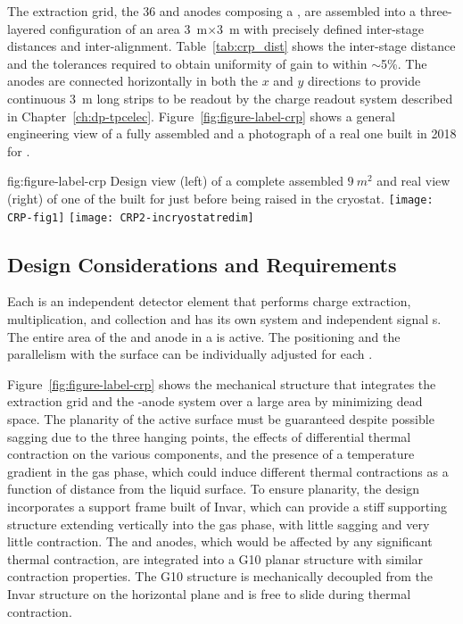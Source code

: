 The extraction grid, the \num{36}  and anodes composing a , are assembled into a three-layered configuration of an area \SI{3}{\m}$\times$\SI{3}{\m} with precisely defined inter-stage distances and inter-alignment. Table~\ref{tab:crp_dist} shows the inter-stage distance and the tolerances required to obtain uniformity of gain to within $\sim$5\%.
The anodes are connected horizontally in both the $x$ and $y$ directions to provide continuous \SI{3}{\m} long strips to be readout by the charge readout system described in Chapter~\ref{ch:dp-tpcelec}. Figure~\ref{fig:figure-label-crp} shows a general engineering view of a  fully assembled  and a photograph of a real one built in \num{2018} for .

\begin{dunefigure}
{fig:figure-label-crp}
{Design view (left) of a complete assembled  $\SI{9}{m^{2}}$  and real view (right) of one of the  built for  just before being raised in the cryostat.}
\texttt{[image: CRP-fig1]}
\texttt{[image: CRP2-incryostatredim]}
\end{dunefigure}

 

\subsection{Design Considerations and Requirements}
\label{ch:dp-crp-consider-requirements}

Each  is an independent detector element that performs charge extraction, multiplication, and collection and has its own  system and independent signal \fdth{}s. The entire area of the  and anode in a  is active. The positioning and the parallelism with the  surface can be individually adjusted for each .

Figure~\ref{fig:figure-label-crp} shows the  mechanical structure that integrates the extraction grid and the -anode system over a large area by minimizing dead space. The planarity of the active surface must be guaranteed despite possible sagging due to the three hanging points, the effects of differential thermal contraction on the various  components, and the presence of a temperature gradient in the gas phase, which could induce different thermal contractions as a function of distance from the liquid surface. To ensure planarity, the design  incorporates a support frame built of Invar, which can provide a stiff supporting structure extending vertically into the gas phase, with little sagging and very little contraction. The  and anodes, which would be affected by any significant thermal contraction, are integrated into a G10 planar structure with similar contraction properties. The G10 structure is mechanically decoupled from the Invar structure on the horizontal plane and is free to slide during thermal contraction.

